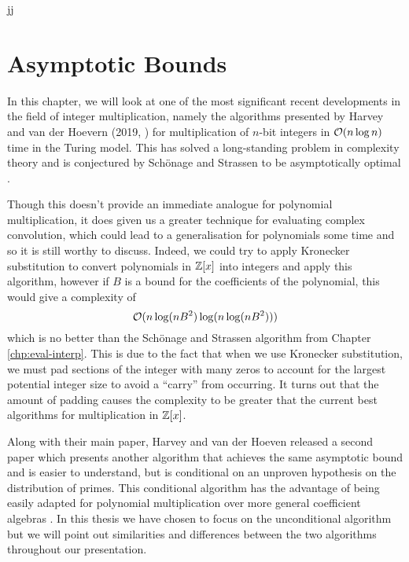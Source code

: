 jj\chapter{Asymptotic Bounds}\label{chp:asymptotic}

In this chapter, we will look at one of the most significant recent developments in the field of integer multiplication, namely the algorithms presented by Harvey and van der Hoevern (2019, \cite{nlogn}) for multiplication of $n$-bit integers in $\mathcal O(n \log n)$ time in the Turing model. This has solved a long-standing problem in complexity theory and is conjectured by Sch\"{o}nage and Strassen to be asymptotically optimal \cite{sch-str-optimality-int-mult}. 

Though this doesn't provide an immediate analogue for polynomial multiplication, it does given us a greater technique for evaluating complex convolution, which could lead to a generalisation for polynomials some time and so it is still worthy to discuss. Indeed, we could try to apply Kronecker substitution to convert polynomials in ${\mathbb Z}[x]$ into integers and apply this algorithm, however if $B$ is a bound for the coefficients of the polynomial, this would give a complexity of 
\[
    \mathcal O(n \log (n B^2) \log (n \log (n B^2)))
\]
which is no better than the Sch\"{o}nage and Strassen algorithm from Chapter \ref{chp:eval-interp}. This is due to the fact that when we use Kronecker substitution, we must pad sections of the integer with many zeros to account for the largest potential integer size to avoid a ``carry'' from occurring. It turns out that the amount of padding causes the complexity to be greater that the current best algorithms for multiplication in ${\mathbb Z}[x]$.

\medskip

Along with their main paper, Harvey and van der Hoeven released a second paper \cite{ffnlogn} which presents another algorithm that achieves the same asymptotic bound and is easier to understand, but is conditional on an unproven hypothesis on the distribution of primes. This conditional algorithm has the advantage of being easily adapted for polynomial multiplication over more general coefficient algebras \cite{ffnlogn}. In this thesis we have chosen to focus on the unconditional algorithm but we will point out similarities and differences between the two algorithms throughout our presentation.

\medskip

